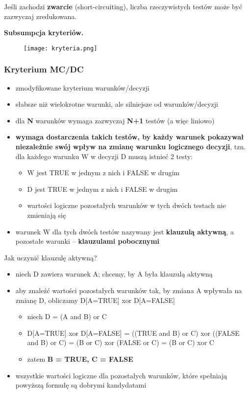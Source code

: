 \documentclass[../main.tex]{subfiles}
\begin{document}
    Jeśli zachodzi \textbf{zwarcie} (short-circuiting), liczba rzeczywistych testów może być zazwyczaj zredukowana.


    \textbf{Subsumpcja kryteriów.}
    \begin{figure}[H]
        \texttt{[image: kryteria.png]}
    \end{figure}

    \subsubsection{Kryterium MC/DC}

    \begin{itemize}
        \item zmodyfikowane kryterium warunków/decyzji
        \item słabsze niż wielokrotne warunki, ale silniejsze od warunków/decyzji
        \item dla \textbf{N} warunków wymaga zazwyczaj \textbf{N+1} testów (a więc liniowo)
        \item \textbf{wymaga dostarczenia takich testów, by każdy warunek pokazywał niezależnie swój wpływ na zmianę warunku
        logicznego decyzji}, tzn. dla każdego warunku W w decyzji D muszą istnieć 2 testy:
        \begin{itemize}
            \item W jest TRUE w jednym z nich i FALSE w drugim
            \item D jest TRUE w jednym z nich i FALSE w drugim
            \item wartości logiczne pozostałych warunków w tych dwóch testach
            nie zmieniają się
        \end{itemize}
        \item warunek W dla tych dwóch testów nazywany jest \textbf{klauzulą aktywną},
        a pozostałe warunki – \textbf{klauzulami pobocznymi}
    \end{itemize}

    Jak uczynić klauzulę aktywną?
    \begin{itemize}
        \item niech D zawiera warunek A; chcemy, by A była klauzulą aktywną
        \item aby znaleźć wartości pozostałych warunków tak, by zmiana A wpływała
        na zmianę D, obliczamy D[A=TRUE] xor D[A=FALSE]
        \begin{itemize}
            \item niech D = (A and B) or C
            \item D[A=TRUE] xor D[A=FALSE] =
            ((TRUE and B) or C) xor ((FALSE and B) or C) =
            (B or C) xor (FALSE or C) = (B or C) xor C
            \item zatem \textbf{B = TRUE, C = FALSE}
        \end{itemize}
        \item wszystkie wartości logiczne dla pozostałych warunków, które spełniają
        powyższą formułę są dobrymi kandydatami
    \end{itemize}
\end{document}
